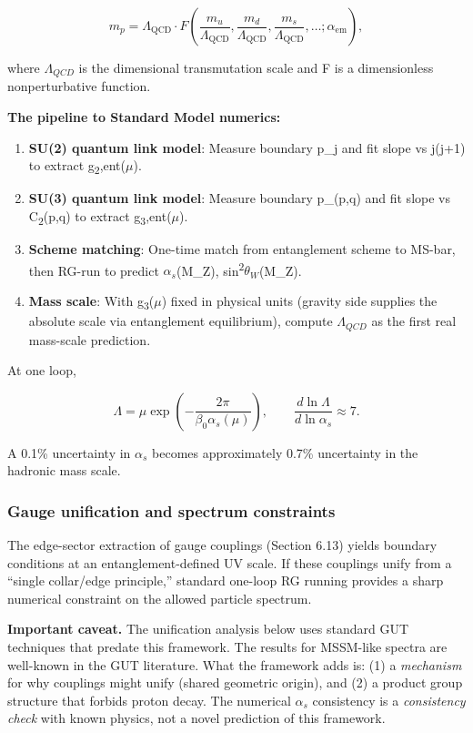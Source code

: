 \documentclass[11pt,a4paper]{article}
\theoremstyle{remark}
\begin{document}
\[
m_p = \Lambda_{\mathrm{QCD}} \cdot F\left(\frac{m_u}{\Lambda_{\mathrm{QCD}}},
\frac{m_d}{\Lambda_{\mathrm{QCD}}}, \frac{m_s}{\Lambda_{\mathrm{QCD}}}, \ldots;
\alpha_{\mathrm{em}}\right),
\]

where $\Lambda_{QCD}$ is the dimensional transmutation scale and F is a
dimensionless nonperturbative function.

\textbf{The pipeline to Standard Model numerics:}

\begin{enumerate}
\def\labelenumi{\arabic{enumi}.}
\item
  \textbf{SU(2) quantum link model}: Measure boundary p\_j and fit slope
  vs j(j+1) to extract g\textsubscript{2},ent(\ensuremath{\mu}).
\item
  \textbf{SU(3) quantum link model}: Measure boundary p\_(p,q) and fit
  slope vs C\textsubscript{2}(p,q) to extract g\textsubscript{3},ent(\ensuremath{\mu}).
\item
  \textbf{Scheme matching}: One-time match from entanglement scheme to
  MS-bar, then RG-run to predict $\alpha_s$(M\_Z), sin\textsuperscript{2}$\theta_W$(M\_Z).
\item
  \textbf{Mass scale}: With g\textsubscript{3}(\ensuremath{\mu}) fixed in physical units (gravity side
  supplies the absolute scale via entanglement equilibrium), compute
  $\Lambda_{QCD}$ as the first real mass-scale prediction.
\end{enumerate}

At one loop,

\[
\Lambda = \mu \exp\left(-\frac{2\pi}{\beta_0 \alpha_s(\mu)}\right),
\qquad
\frac{d \ln \Lambda}{d \ln \alpha_s} \approx 7.
\]

A 0.1\% uncertainty in $\alpha_s$ becomes approximately 0.7\% uncertainty in the
hadronic mass scale.

\subsubsection{Gauge unification and spectrum constraints}\label{gauge-unification-and-spectrum-constraints}

The edge-sector extraction of gauge couplings (Section 6.13) yields boundary
conditions at an entanglement-defined UV scale. If these couplings unify from a
``single collar/edge principle,'' standard one-loop RG running provides a sharp
numerical constraint on the allowed particle spectrum.

\textbf{Important caveat.} The unification analysis below uses standard GUT
techniques that predate this framework. The results for MSSM-like spectra
are well-known in the GUT literature. What the framework adds is:
(1) a \emph{mechanism} for why couplings might unify (shared geometric origin),
and (2) a product group structure that forbids proton decay. The numerical
$\alpha_s$ consistency is a \emph{consistency check} with known physics, not a
novel prediction of this framework.
\end{document}
